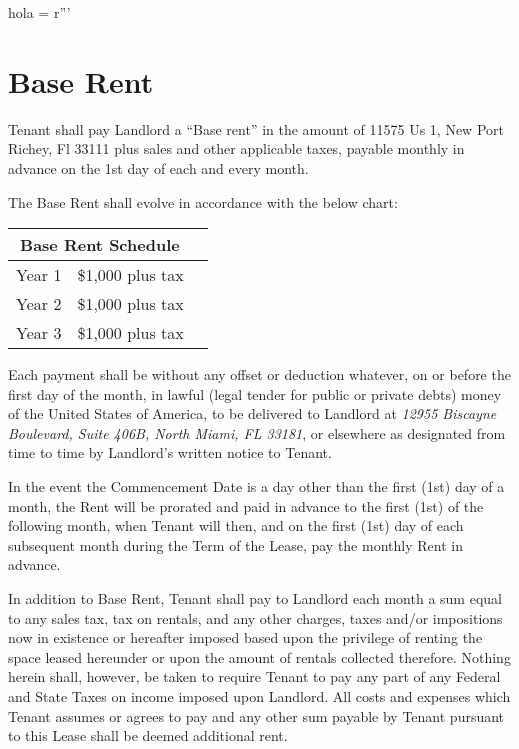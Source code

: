 hola = r'''\documentclass{article}
\newcommand{\corpaddress}{12955 Biscayne Boulevard, Suite 406B, North Miami, FL 33181}
\newcommand{\baserent}{11575 Us 1, New Port Richey, Fl 33111}
\begin{document}
\section{Base Rent}
    Tenant shall pay Landlord a ``Base rent'' in the amount of \baserent{} plus sales and other applicable taxes, payable monthly in advance on the 1st day of each and every month. 
    \begin{minipage}{\textwidth}
    The Base Rent shall evolve in accordance with the below chart:
    \vspace{1cm}
    \begin{center}
    \begin{tabular}{ |p{3cm}|p{3cm}|p{3cm}|  }
    \hline
    \multicolumn{2}{|c|}{Base Rent Schedule} \\
    \hline
    \hline
    Year 1 & \$1,000 plus tax \\
    Year 2 & \$1,000 plus tax \\
    Year 3 & \$1,000 plus tax \\
    \hline
    \end{tabular}
    \end{center}
    \end{minipage}
    

    Each payment shall be without any offset or deduction whatever, on or before the first day of the month, in lawful (legal tender for public or private debts) money of the United States of America, to be delivered to Landlord at \textit{\corpaddress},{} or elsewhere as designated from time to time by Landlord's written notice to Tenant.

    In the event the Commencement Date is a day other than the first (1st) day of a month, the Rent will be prorated and paid in advance to the first (1st) of the following month, when Tenant will then, and on the first (1st) day of each subsequent month during the Term of the Lease, pay the monthly Rent in advance.

    In addition to Base Rent, Tenant shall pay to Landlord each month a sum equal to any sales tax, tax on rentals, and any other charges, taxes and/or impositions now in existence or hereafter imposed based upon the privilege of renting the space leased hereunder or upon the amount of rentals collected therefore. Nothing herein shall, however, be taken to require Tenant to pay any part of any Federal and State Taxes on income imposed upon Landlord.  All costs and expenses which Tenant assumes or agrees to pay and any other sum payable by Tenant pursuant to this Lease shall be deemed additional rent.  
\end{document}
